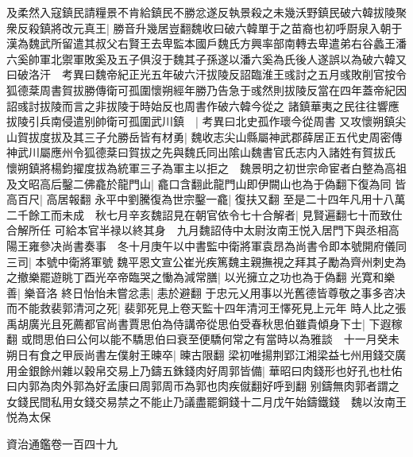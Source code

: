 及柔然入寇鎮民請糧景不肯給鎮民不勝忿遂反執景殺之未幾沃野鎮民破六韓拔陵聚衆反殺鎮將改元真王|{
	勝音升幾居豈翻魏收曰破六韓單于之苗裔也初呼㕑泉入朝于漢為魏武所留遣其叔父右賢王去卑監本國戶魏氏方興率部南轉去卑遣弟右谷蠡王潘六奚帥軍北禦軍敗奚及五子俱沒于魏其子孫遂以潘六奚為氏後人遂誤以為破六韓又曰破洛汗　考異曰魏帝紀正光五年破六汗拔陵反詔臨淮王彧討之五月彧敗削官按令狐德棻周書賀拔勝傳衛可孤圍懷朔經年勝乃告急于彧然則拔陵反當在四年蓋帝紀因詔彧討拔陵而言之非拔陵于時始反也周書作破六韓今從之}
諸鎮華夷之民往往響應拔陵引兵南侵遣别帥衛可孤圍武川鎮　|{
	考異曰北史孤作瓌今從周書}
又攻懷朔鎮尖山賀拔度拔及其三子允勝岳皆有材勇|{
	魏收志尖山縣屬神武郡薛居正五代史周密傳神武川屬應州令狐德棻曰賀拔之先與魏氏同出隂山魏書官氏志内入諸姓有賀拔氏}
懷朔鎮將楊鈞擢度拔為統軍三子為軍主以拒之　魏景明之初世宗命宦者白整為高祖及文昭高后鑿二佛龕於龍門山|{
	龕口含翻此龍門山即伊闕山也為于偽翻下復為同}
皆高百尺|{
	高居報翻}
永平中劉騰復為世宗鑿一龕|{
	復扶又翻}
至是二十四年凡用十八萬二千餘工而未成　秋七月辛亥魏詔見在朝官依令七十合解者|{
	見賢遍翻七十而致仕合解所任}
可給本官半禄以終其身　九月魏詔侍中太尉汝南王悦入居門下與丞相高陽王雍參决尚書奏事　冬十月庚午以中書監中衛將軍袁昂為尚書令即本號開府儀同三司|{
	本號中衛將軍號}
魏平恩文宣公崔光疾篤魏主親撫視之拜其子勵為齊州刺史為之撤樂罷遊眺丁酉光卒帝臨哭之慟為減常膳|{
	以光擁立之功也為于偽翻}
光寛和樂善|{
	樂音洛}
終日怡怡未嘗忿恚|{
	恚於避翻}
于忠元乂用事以光舊德皆尊敬之事多咨决而不能救裴郭清河之死|{
	裴郭死見上卷天監十四年清河王懌死見上元年}
時人比之張禹胡廣光且死薦都官尚書賈思伯為侍講帝從思伯受春秋思伯雖貴傾身下士|{
	下遐稼翻}
或問思伯曰公何以能不驕思伯曰衰至便驕何常之有當時以為雅談　十一月癸未朔日有食之甲辰尚書左僕射王暕卒|{
	暕古限翻}
梁初唯揚荆郢江湘梁益七州用錢交廣用金銀餘州雜以穀帛交易上乃鑄五銖錢肉好周郭皆備|{
	華昭曰肉錢形也好孔也杜佑曰内郭為肉外郭為好孟康曰周郭周帀為郭也肉疾僦翻好呼到翻}
别鑄無肉郭者謂之女錢民間私用女錢交易禁之不能止乃議盡罷銅錢十二月戊午始鑄鐵錢　魏以汝南王悦為太保

資治通鑑卷一百四十九
